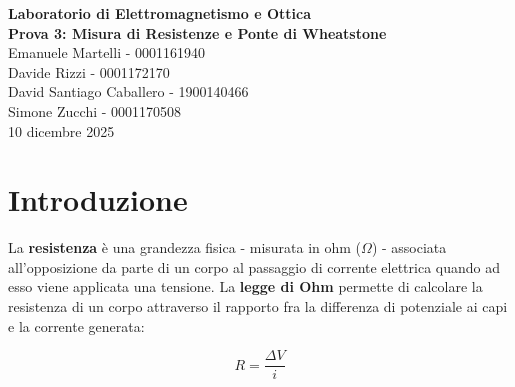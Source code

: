 \documentclass[11pt]{article}
\begin{document}
\begin{center}
    {\textbf{\Large Laboratorio di Elettromagnetismo e Ottica}}\\[0.5cm]
    {\textbf{\Large Prova 3: Misura di Resistenze e Ponte di Wheatstone}}\\[0.7cm]
    {\large Emanuele Martelli - 0001161940 \\ Davide Rizzi - 0001172170 \\ David Santiago Caballero - 1900140466 \\ Simone Zucchi - 0001170508}\\[0.7cm]
    {\large 10 dicembre 2025}
\end{center}


\renewcommand{\abstractname}{Abstract}
\begin{abstract}
    Scopo dell’esperimento è stata la misurazione della resistenza di tre resistori, 
    nel nostro caso da $15 \; \Omega$, $670 \; \Omega$ e $15 \; \text{k}\Omega$, e delle 
    combinazioni di alcune di loro, in particolare le prime due in serie e in parallelo. 
    La misura è stata svolta in tre diverse metodologie diverse: una basantesi sull'utilizzo del 
    \textbf{Multimetro Digitale} (\textit{Digital MultiMeter}, DMM) della scheda Elvis II, una sulla 
    \textbf{legge di Ohm} applicata al grafico corrente-tensione, e infine una sull’utilizzo di un \textbf{ponte di 
    Wheatstone} con resistenze appositamente bilanciate. I risultati di tutte e tre le misurazioni 
    sono risultati \textbf{compatibili} con il valore di fabbricazione delle resistenze utilizzate, tenendo 
    conto dell’intervallo di tolleranza dei valori.
\end{abstract}

\section{Introduzione}
La \textbf{resistenza} è una grandezza fisica - misurata in ohm ($\Omega$) - associata all'opposizione da parte di un corpo al passaggio di 
corrente elettrica quando ad esso viene applicata una tensione. La \textbf{legge di Ohm} permette 
di calcolare la resistenza di un corpo attraverso il rapporto fra la differenza di potenziale ai capi e la corrente generata:

\begin{equation}
    R = \frac{\Delta V}{i}
    \label{eq:leggeOhm}
\end{equation}
\end{document}
